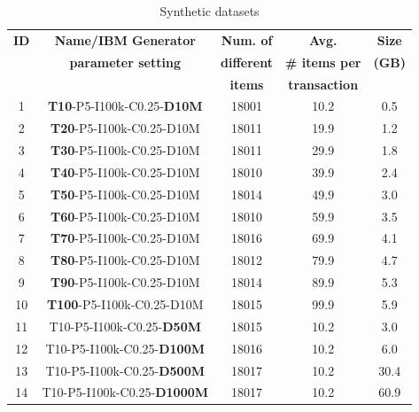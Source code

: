 \begin{table}[h!]
\scriptsize
\begin{center}
\caption{Synthetic datasets}
\label{datasets_transactions}
\begin{tabular}{|c|c|c|c|c|}
\hline
{\bf ID }& {\bf Name/IBM Generator} &  {\bf Num. of} & {\bf  Avg.} & {\bf Size} \\
{\bf  }& {\bf  parameter setting} &  {\bf different} & {\bf \# items per } & {\bf (GB) } \\
{\bf  } & {\bf } & {\bf items} & {\bf  transaction } & {\bf } \\ \hline
 \hline
1 & \textbf{T10}-P5-I100k-C0.25-\textbf{D10M} &  18001 & 10.2 &  0.5 \\ \hline
2  & \textbf{T20}-P5-I100k-C0.25-D10M  & 18011 & 19.9 & 1.2 \\ \hline
3  & \textbf{T30}-P5-I100k-C0.25-D10M  & 18011 & 29.9 & 1.8 \\ \hline
4 & \textbf{T40}-P5-I100k-C0.25-D10M  & 18010 & 39.9 & 2.4 \\ \hline
5 & \textbf{T50}-P5-I100k-C0.25-D10M  & 18014 & 49.9 & 3.0 \\ \hline
6 & \textbf{T60}-P5-I100k-C0.25-D10M  & 18010 & 59.9 & 3.5 \\ \hline
7 & \textbf{T70}-P5-I100k-C0.25-D10M  & 18016 & 69.9 & 4.1 \\ \hline
8 & \textbf{T80}-P5-I100k-C0.25-D10M  & 18012 & 79.9 & 4.7 \\ \hline
9 & \textbf{T90}-P5-I100k-C0.25-D10M  & 18014 & 89.9 & 5.3 \\ \hline
10 & \textbf{T100}-P5-I100k-C0.25-D10M & 18015 & 99.9 & 5.9 \\ \hline
11 & T10-P5-I100k-C0.25-\textbf{D50M} &  18015 & 10.2 & 3.0 \\ \hline
12 & T10-P5-I100k-C0.25-\textbf{D100M} &  18016 & 10.2 & 6.0 \\ \hline
13 & T10-P5-I100k-C0.25-\textbf{D500M} &  18017 & 10.2 &  30.4 \\ \hline
14 & T10-P5-I100k-C0.25-\textbf{D1000M} &  18017 & 10.2 &  60.9 \\ \hline
\end{tabular}
\end{center}
\end{table}


